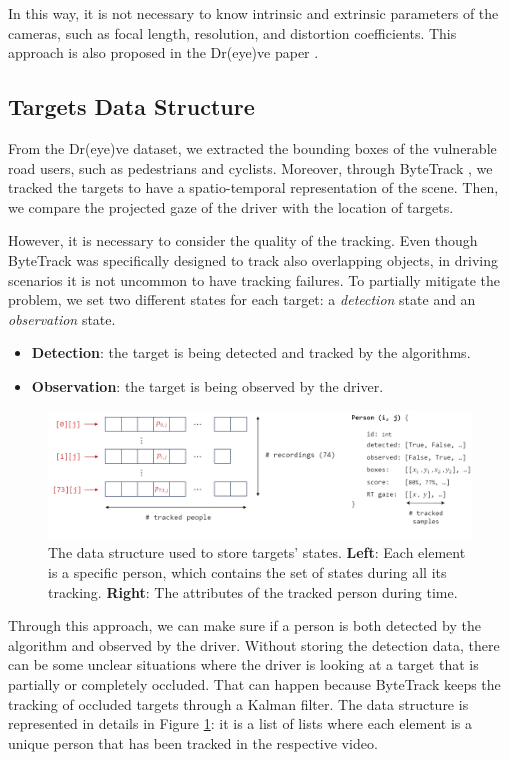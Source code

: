 In this way, it is not necessary to know intrinsic and extrinsic parameters of 
the cameras, such as focal length, resolution, and distortion coefficients. 
This approach is also proposed in the Dr(eye)ve paper \cite{dreyeve}.


\subsection{Targets Data Structure}
From the Dr(eye)ve dataset, we extracted the bounding boxes of the vulnerable 
road users, such as pedestrians and cyclists.
Moreover, through ByteTrack \cite{bytetrack}, we tracked the targets to have a 
spatio-temporal representation of the scene. Then, we compare the projected gaze 
of the driver with the location of targets. 

However, it is necessary to consider the quality of the tracking. Even though 
ByteTrack was specifically designed to track also overlapping objects, in driving 
scenarios it is not uncommon to have tracking failures. To partially mitigate 
the problem, we set two different states for each target: a 
\emph{detection} state and an \emph{observation} state.
\begin{itemize}
    \addtolength\itemsep{-2mm}
    \item \textbf{Detection}: the target is being detected and tracked by the algorithms.
    \item \textbf{Observation}: the target is being observed by the driver.
\end{itemize}

\begin{figure}
\centering
\includegraphics[width=\textwidth]{images/dreyeve/targets_data.png}
\caption[Data structure to store targets' states]
{The data structure used to store targets' states.
\textbf{Left}: Each element is a specific person, which contains the set of 
states during all its tracking.
\textbf{Right}: The attributes of the tracked person during time.
}
\label{fig:targets_data_structure}
\end{figure}
Through this approach, we can make sure if a person is both detected by the 
algorithm and observed by the driver. Without storing the detection data, there 
can be some unclear situations where the driver is looking at a target that is 
partially or completely occluded. That can happen because ByteTrack keeps the 
tracking of occluded targets through a Kalman filter. 
The data structure is represented in details 
in Figure \ref{fig:targets_data_structure}: it is a list of lists where each 
element is a unique person that has been tracked in the respective video.

